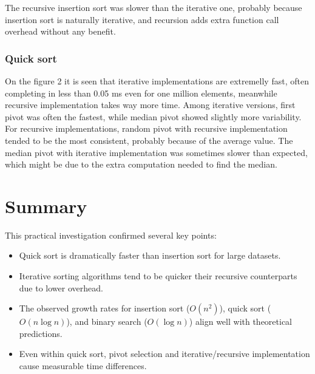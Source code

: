 \documentclass{article}
\begin{document}
The recursive insertion sort was slower than the iterative one, probably because insertion sort is naturally iterative, and recursion adds extra function call overhead without any benefit.

\subsubsection{Quick sort}
On the figure 2 it is seen that iterative implementations are extremelly fast, often completing in less than 0.05 ms even for one million elements, meanwhile recursive implementation takes way more time. Among iterative versions, first pivot was often the fastest, while median pivot showed slightly more variability. For recursive implementations, random pivot with recursive implementation tended to be the most consistent, probably because of the average value. The median pivot with iterative implementation was sometimes slower than expected, which might be due to the extra computation needed to find the median.

\section{Summary}
This practical investigation confirmed several key points:
\begin{itemize}
\item Quick sort is dramatically faster than insertion sort for large datasets.
\item Iterative sorting algorithms tend to be quicker their recursive counterparts due to lower overhead.
\item The observed growth rates for insertion sort ($O(n^2)$), quick sort ($O(n \log n)$), and binary search ($O(\log n)$) align well with theoretical predictions.
\item Even within quick sort, pivot selection and iterative/recursive implementation cause measurable time differences.
\end{itemize}

\end{document}
